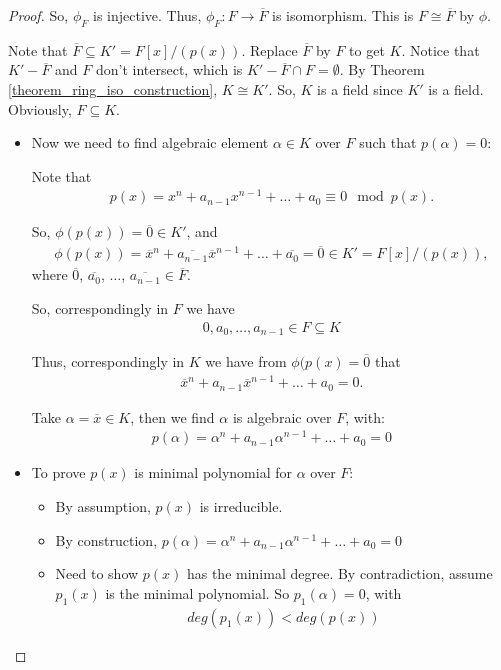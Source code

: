 \documentclass[utf8]{ctexbook}
\begin{document}
\begin{proof}
So, $\phi_{F}$ is injective. Thus, $\phi_{F} : F \longrightarrow \overline{F}$ is isomorphism. This is $F \cong \overline{F}$ by $\phi$.

Note that $\overline{F} \subseteq K' = F[x] / (p(x)) $. Replace $\overline{F}$ by $F$ to get $K$. Notice that $K' - \overline{F} $ and $ F$ don't intersect, which is $ K' - \overline{F} \cap F = \emptyset $. By Theorem \ref{theorem_ring_iso_construction}, $K \cong K'$. So, $K$ is a field since $K'$ is a field. Obviously, $F \subseteq K$.


\begin{itemize}
\item{Now we need to find algebraic element $\alpha \in  K $ over $F$ such that $p(\alpha) = 0$: 

Note that 
\begin{align*}
p(x) = x^n + a_{n-1} x^{n-1} + \ldots + a_0 \equiv 0 \mod p(x) .
\end{align*}

So, $\phi(p(x)) = \overline{0} \in K' $, and
\begin{align*}
\phi(p(x)) = \overline{x}^n + \overline{a_{n-1}} \overline{x}^{n-1} + \ldots + \overline{a_0} = \overline{0} \in K' = F[x]/(p(x)),
\end{align*}
where $\overline{0}$, $\overline{a_0}$, $\ldots$, $\overline{a_{n-1}} \in \overline{F}$.

So, correspondingly in $F$ we have
\begin{align*}
0, a_0, \ldots, a_{n-1} \in F \subseteq K
\end{align*}

Thus, correspondingly in $K$ we have from $\phi(p(x) = \overline{0}$ that
\begin{align*}
\overline{x}^n + a_{n-1} \overline{x}^{n-1} + \ldots + a_0 = 0 .
\end{align*}

Take $\alpha = \overline{x} \in K$, then we find $\alpha$ is algebraic over $F$, with:
\begin{align*}
p(\alpha) = \alpha^n + a_{n-1} \alpha^{n-1} + \ldots + a_0 = 0
\end{align*}
}
\item{To prove $p(x)$ is minimal polynomial for $\alpha$ over $F$:
\begin{itemize}
\item{By assumption, $p(x)$ is irreducible.}
\item{By construction, $p(\alpha) = \alpha^n + a_{n-1} \alpha^{n-1} + \ldots + a_0 = 0$ }
\item{Need to show $p(x)$ has the minimal degree. By contradiction, assume $p_1 (x)$ is the minimal polynomial. So $p_1 (\alpha) = 0$, with
\begin{align*}
deg(p_1 (x)) < deg(p(x))
\end{align*}

}
\end{itemize}}
\end{itemize}
\end{proof}
\end{document}
